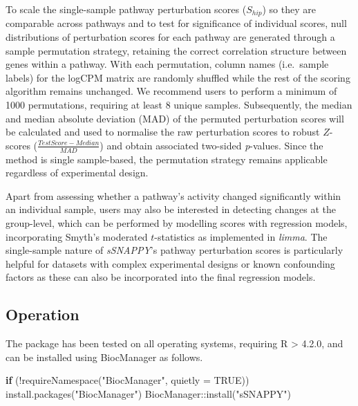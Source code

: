 \documentclass[9pt,a4paper,]{extarticle}
\newenvironment{Shaded}{\begin{snugshade}}{\end{snugshade}}
\newcommand{\AttributeTok}[1]{\textcolor[rgb]{0.77,0.63,0.00}{#1}}
\newcommand{\ConstantTok}[1]{\textcolor[rgb]{0.00,0.00,0.00}{#1}}
\newcommand{\ControlFlowTok}[1]{\textcolor[rgb]{0.13,0.29,0.53}{\textbf{#1}}}
\newcommand{\FunctionTok}[1]{\textcolor[rgb]{0.00,0.00,0.00}{#1}}
\newcommand{\NormalTok}[1]{#1}
\newcommand{\SpecialCharTok}[1]{\textcolor[rgb]{0.00,0.00,0.00}{#1}}
\newcommand{\StringTok}[1]{\textcolor[rgb]{0.31,0.60,0.02}{#1}}
\begin{document}
To scale the single-sample pathway perturbation scores (\(S_{hip}\)) so they are comparable across pathways and to test for significance of individual scores, null distributions of perturbation scores for each pathway are generated through a sample permutation strategy, retaining the correct correlation structure between genes within a pathway.
With each permutation, column names (i.e.~sample labels) for the logCPM matrix are randomly shuffled while the rest of the scoring algorithm remains unchanged.
We recommend users to perform a minimum of 1000 permutations, requiring at least 8 unique samples.
Subsequently, the median and median absolute deviation (MAD) of the permuted perturbation scores will be calculated and used to normalise the raw perturbation scores to robust \(Z\)-scores (\(\frac{Test Score - Median}{MAD}\)) and obtain associated two-sided \emph{p}-values.
Since the method is single sample-based, the permutation strategy remains applicable regardless of experimental design.

Apart from assessing whether a pathway's activity changed significantly within an individual sample, users may also be interested in detecting changes at the group-level, which can be performed by modelling scores with regression models, incorporating Smyth's moderated \(t\)-statistics\citep{Smyth_2004} as implemented in \emph{limma}\citep{limma_2015}.
The single-sample nature of \emph{sSNAPPY}'s pathway perturbation scores is particularly helpful for datasets with complex experimental designs or known confounding factors as these can also be incorporated into the final regression models.

\hypertarget{operation}{%
\subsection{Operation}\label{operation}}

The package has been tested on all operating systems, requiring R \textgreater{} 4.2.0, and can be installed using BiocManager as follows.

\begin{Shaded}
\begin{Highlighting}[]
\ControlFlowTok{if}\NormalTok{ (}\SpecialCharTok{!}\FunctionTok{requireNamespace}\NormalTok{(}\StringTok{"BiocManager"}\NormalTok{, }\AttributeTok{quietly =} \ConstantTok{TRUE}\NormalTok{))}
  \FunctionTok{install.packages}\NormalTok{(}\StringTok{"BiocManager"}\NormalTok{)}
\NormalTok{BiocManager}\SpecialCharTok{::}\FunctionTok{install}\NormalTok{(}\StringTok{"sSNAPPY"}\NormalTok{)}
\end{Highlighting}
\end{Shaded}
\end{document}
